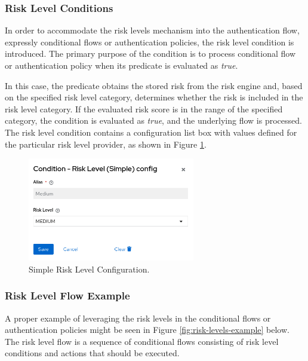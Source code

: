 \newpage

\subsubsection{Risk Level Conditions}
In order to accommodate the risk levels mechanism into the authentication flow, expressly conditional flows or authentication policies, the risk level condition is introduced.
The primary purpose of the condition is to process conditional flow or authentication policy when its predicate is evaluated as \textit{true}.

In this case, the predicate obtains the stored risk from the risk engine and, based on the specified risk level category, determines whether the risk is included in the risk level category.
If the evaluated risk score is in the range of the specified category, the condition is evaluated as \textit{true}, and the underlying flow is processed.
\newline
\newline
The risk level condition contains a configuration list box with values defined for the particular risk level provider, as shown in Figure \ref{fig:risk-levels-simple-config}.

\begin{figure}[htbp]
  \centering
  \includegraphics[width=0.65\textwidth]{img/sections/5-design/risk-level-simple-config.png}
  \caption{Simple Risk Level Configuration.}
  \label{fig:risk-levels-simple-config}
\end{figure}

\subsubsection{Risk Level Flow Example}

A proper example of leveraging the risk levels in the conditional flows or authentication policies might be seen in Figure \ref{fig:risk-levels-example} below.
The risk level flow is a sequence of conditional flows consisting of risk level conditions and actions that should be executed.

